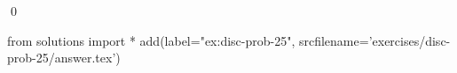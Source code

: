 
\begin{ex} 
  \label{ex:disc-prob-25}
  
  \qed
\end{ex} 
\begin{python0}
from solutions import *
add(label="ex:disc-prob-25",
    srcfilename='exercises/disc-prob-25/answer.tex') 
\end{python0}
